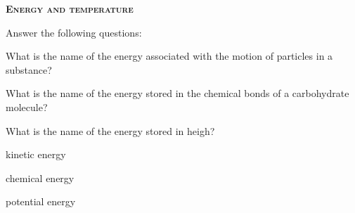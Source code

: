 \documentclass[main.tex]{subfiles}
\begin{document}
\newpage
\setdoublesep{0.35700 em}  %
\setatomsep{1.78500 em}    %
\setbondoffset{0.18265 em} %
\newcommand{\bondwidth}{0.06642 em} %
\setbondstyle{line width = \bondwidth}
\fancyhfoffset[E,O]{0pt}
\setlength{\columnsep}{30pt}
\begin{conclusion}
\end{conclusion}
\begin{multicols*}{2}\setcounter{numA}{1}





{\raggedright\textsc{\textbf{Energy and temperature }}\par}

\begin{question}[ID=\the\value{numA}]
Answer the following questions:
\begin{inparaenum}[(a)]	
\item What is the name of the energy associated with the motion of particles in a substance?
\item	 What is the name of the energy stored in the chemical bonds of a carbohydrate molecule? 
\item  What is the name of the energy stored in heigh?
\end{inparaenum} 
\end{question}
\begin{solution}\begin{inparaenum}[(a)]
\item kinetic energy
\item chemical energy
\item potential energy
\end{inparaenum}\hspace{0.1cm}\end{solution}%


\end{multicols*}
\end{document}
